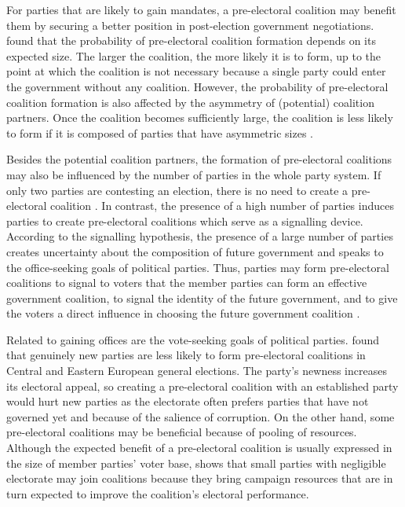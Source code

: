 \documentclass[]{interact}
\theoremstyle{plain}%
\theoremstyle{definition}
\theoremstyle{remark}
\begin{document}
For parties that are likely to gain mandates, a pre-electoral coalition may benefit them by securing a better position in post-election government negotiations. \citet{golder2006b} found that the probability of pre-electoral coalition formation depends on its expected size. The larger the coalition, the more likely it is to form, up to the point at which the coalition is not necessary because a single party could enter the government without any coalition. However, the probability of pre-electoral coalition formation is also affected by the asymmetry of (potential) coalition partners. Once the coalition becomes sufficiently large, the coalition is less likely to form if it is composed of parties that have asymmetric sizes \citep[199]{golder2006b}. 

Besides the potential coalition partners, the formation of pre-electoral coalitions may also be influenced by the number of parties in the whole party system. 
If only two parties are contesting an election, there is no need to create a pre-electoral coalition \citep{golder2005}. In contrast, the presence of a high number of parties induces parties to create pre-electoral coalitions which serve as a signalling device. According to the signalling hypothesis, the presence of a large number of parties creates uncertainty about the composition of future government and speaks to the office-seeking goals of political parties. Thus, parties may form pre-electoral coalitions to signal to voters that the member parties can form an effective government coalition, to signal the identity of the future government, and to give the voters a direct influence in choosing the future government coalition \citep{golder2005}.

Related to gaining offices are the vote-seeking goals of political parties. \citet{ibenskas2016} found that genuinely new parties are less likely to form pre-electoral coalitions in Central and Eastern European general elections. The party's newness increases its electoral appeal, so creating a pre-electoral coalition with an established party would hurt new parties as the electorate often prefers parties that have not governed yet and because of the salience of corruption. On the other hand, some pre-electoral coalitions may be beneficial because of pooling of resources. Although the expected benefit of a pre-electoral coalition is usually expressed in the size of member parties' voter base, \citet{silva2022} shows that small parties with negligible electorate may join coalitions because they bring campaign resources that are in turn expected to improve the coalition's electoral performance.
\end{document}
